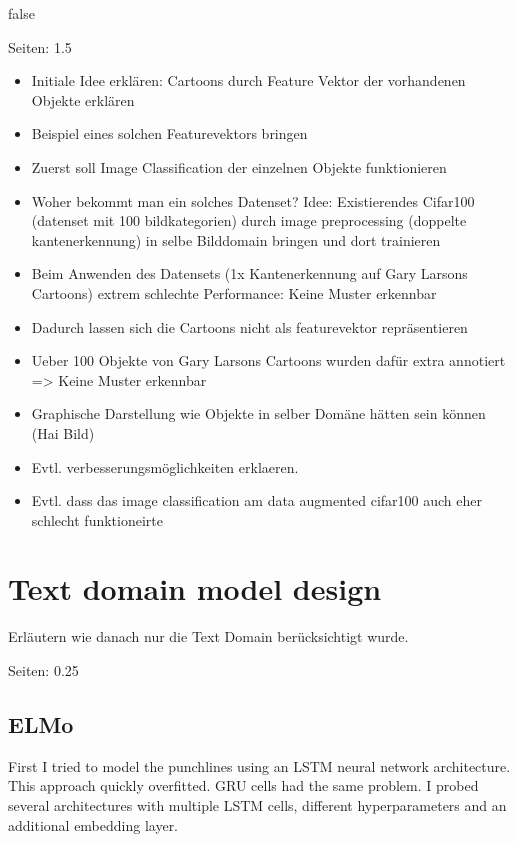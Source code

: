 \documentclass[draft,final,oneside]{vutinfth} %
\begin{document}
\if false

Seiten: 1.5

\begin{itemize}
\item Initiale Idee erklären: Cartoons durch Feature Vektor der vorhandenen Objekte erklären
\item Beispiel eines solchen Featurevektors bringen
\item Zuerst soll Image Classification der einzelnen Objekte funktionieren
\item Woher bekommt man ein solches Datenset? Idee: Existierendes Cifar100 (datenset mit 100 bildkategorien) durch image preprocessing (doppelte kantenerkennung) in selbe Bilddomain bringen und dort trainieren
\item Beim Anwenden des Datensets (1x Kantenerkennung auf Gary Larsons Cartoons) extrem schlechte Performance: Keine Muster erkennbar
\item Dadurch lassen sich die Cartoons nicht als featurevektor repräsentieren
\item Ueber 100 Objekte von Gary Larsons Cartoons wurden dafür extra annotiert => Keine Muster erkennbar
\item Graphische Darstellung wie Objekte in selber Domäne hätten sein können (Hai Bild)
\item Evtl. verbesserungsmöglichkeiten erklaeren.
\item Evtl. dass das image classification am data augmented cifar100 auch eher schlecht funktioneirte
\end{itemize}

\fi

\section{Text domain model design}

Erläutern wie danach nur die Text Domain berücksichtigt wurde.

Seiten: 0.25

\subsection{ELMo}

First I tried to model the punchlines using an LSTM neural network architecture. This approach quickly overfitted. GRU cells had the same problem. I probed several architectures with multiple LSTM cells, different hyperparameters and an additional embedding layer.
\end{document}
